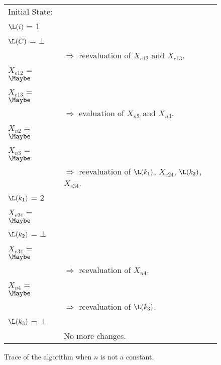 {\begin{figure}%
\begin{center}
\begin{tabular}{ll} \\
Initial State: \\
$\L(i)$ = 1  \\
$\L(C)$ = $\bot$ \\
 &  $\Rightarrow$ reevaluation of $X_{e12}$ and $X_{e13}$.   \\
$X_{e12}$ = $\Maybe$ \\
$X_{e13}$ = $\Maybe$ \\
 &  $\Rightarrow$ evaluation of  $X_{n2}$ and $X_{n3}$. \\
$X_{n2}$ =  $\Maybe$ \\
$X_{n3}$ =  $\Maybe$ \\
 & $\Rightarrow$ reevaluation of $\L(k_1)$, $X_{e24}$,
$\L(k_2)$, $X_{e34}$.  \\
$\L(k_1)$ = 2 \\
$X_{e24}$ = $\Maybe$ \\
$\L(k_2)$ = $\bot$ \\
$X_{e34}$ = $\Maybe$ \\
 & $\Rightarrow$ reevaluation of $X_{n4}$.  \\
$X_{n4}$ = $\Maybe$ \\
 &  $\Rightarrow$  reevaluation of $\L(k_3)$.  \\
$\L(k_3)$ = $\bot$ \\
 & No more changes.  \\
\end{tabular}
\end{center}
\caption{Trace of the algorithm when $n$ is not a constant.}
\label{fig:trace-not-const}
\end{figure}
}


